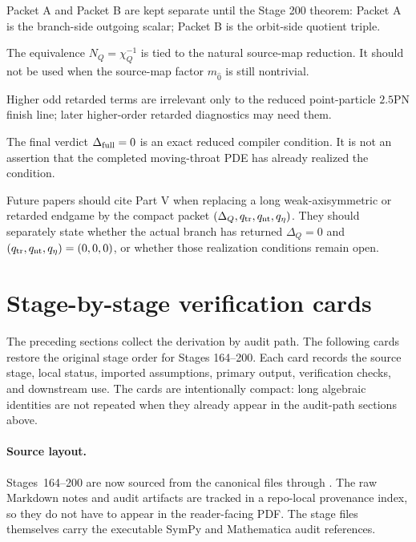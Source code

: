 \begin{verificationchecklist}
\item Packet A and Packet B are kept separate until the Stage 200 theorem: Packet A is the branch-side outgoing scalar; Packet B is the orbit-side quotient triple.
\item The equivalence \(N_Q=\chi_Q^{-1}\) is tied to the natural source-map reduction.  It should not be used when the source-map factor \(m_{\hat0}\) is still nontrivial.
\item Higher odd retarded terms are irrelevant only to the reduced point-particle \(2.5\)PN finish line; later higher-order retarded diagnostics may need them.
\item The final verdict \(\Delta_{\rm full}=0\) is an exact reduced compiler condition.  It is not an assertion that the completed moving-throat PDE has already realized the condition.
\end{verificationchecklist}

Future papers should cite Part V when replacing a long weak-axisymmetric or retarded endgame by the compact packet \((\Delta_Q,q_{\rm tr},q_{\rm nt},q_\eta)\).  They should separately state whether the actual branch has returned \(\Delta_Q=0\) and \((q_{\rm tr},q_{\rm nt},q_\eta)=(0,0,0)\), or whether those realization conditions remain open.

\begingroup
\let\clearpage\relax
\clearpage
\section{Stage-by-stage verification cards}
\label{sec:app-part05-stage-cards}

The preceding sections collect the derivation by audit path.  The following cards restore the original stage order for Stages 164--200.  Each card records the source stage, local status, imported assumptions, primary output, verification checks, and downstream use.  The cards are intentionally compact: long algebraic identities are not repeated when they already appear in the audit-path sections above.


\paragraph{Source layout.}
Stages~164--200 are now sourced from the canonical files  through .  The raw Markdown notes and audit artifacts are tracked in a repo-local provenance index, so they do not have to appear in the reader-facing PDF.  The stage files themselves carry the executable SymPy and Mathematica audit references.

